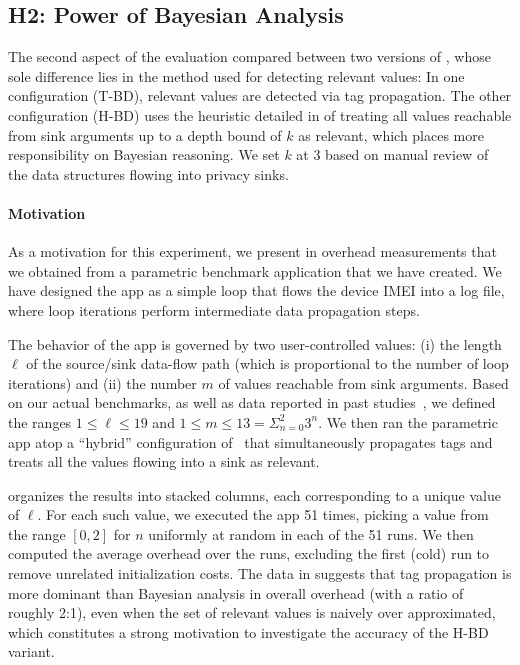 \subsection{H2: Power of Bayesian Analysis}\label{Se:practical}

The second aspect of the evaluation compared between two versions of \Tool, whose sole difference lies in the method used for detecting relevant values: In one configuration (T-BD), relevant values are detected via tag propagation. The other configuration (H-BD) uses the heuristic detailed in  of treating all values reachable from sink arguments up to a depth bound of $k$ as relevant, which places more responsibility on Bayesian reasoning. We set $k$ at 3 based on manual review of the data structures flowing into privacy sinks.

\paragraph{Motivation} As a motivation for this experiment, we present in  overhead measurements that we obtained from a parametric benchmark application that we have created. We have designed the app as a simple loop that flows the device IMEI into a log file, where loop iterations perform intermediate data propagation steps. 

The behavior of the app is governed by two user-controlled values: (i) the length $\ell$ of the source/sink data-flow path (which is proportional to the number of loop iterations) and (ii) the number $m$ of values reachable from sink arguments.
%
Based on our actual benchmarks, as well as data reported in past studies~\cite{TPFSW:PLDI09}, we defined the ranges $1 \leq \ell \leq 19$ and $1 \leq m \leq 13 = \Sigma_{n=0}^{2} 3^n$. We then ran the parametric app atop a ``hybrid'' configuration of \Tool\ that simultaneously propagates tags and treats all the values flowing into a sink as relevant.

 organizes the results into stacked columns, each corresponding to a unique value of $\ell$. For each such value, we executed the app 51 times, picking a value from the range $[0,2]$ for $n$ uniformly at random in each of the 51 runs. We then computed the average overhead over the runs, excluding the first (cold) run to remove unrelated initialization costs. The data in  suggests that tag propagation is more dominant than Bayesian analysis in overall overhead 
(with a ratio of roughly 2:1), even when the set of relevant values is naively over approximated, which constitutes a strong motivation to investigate the accuracy of the H-BD variant.

